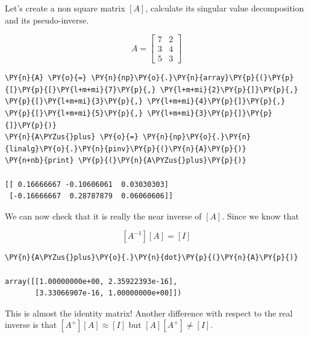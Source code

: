 

Let's create a non square matrix $[A]$, calculate its singular value decomposition and its pseudo-inverse.

\[A=\begin{bmatrix}
7&2\\
3&4\\
5&3\end{bmatrix}\]

\begin{tcolorbox}[breakable, size=fbox, boxrule=1pt, pad at break*=1mm,colback=cellbackground, colframe=cellborder]
\begin{Verbatim}[commandchars=\\\{\}]
\PY{n}{A} \PY{o}{=} \PY{n}{np}\PY{o}{.}\PY{n}{array}\PY{p}{(}\PY{p}{[}\PY{p}{[}\PY{l+m+mi}{7}\PY{p}{,} \PY{l+m+mi}{2}\PY{p}{]}\PY{p}{,} \PY{p}{[}\PY{l+m+mi}{3}\PY{p}{,} \PY{l+m+mi}{4}\PY{p}{]}\PY{p}{,} \PY{p}{[}\PY{l+m+mi}{5}\PY{p}{,} \PY{l+m+mi}{3}\PY{p}{]}\PY{p}{]}\PY{p}{)}
\PY{n}{A\PYZus{}plus} \PY{o}{=} \PY{n}{np}\PY{o}{.}\PY{n}{linalg}\PY{o}{.}\PY{n}{pinv}\PY{p}{(}\PY{n}{A}\PY{p}{)}
\PY{n+nb}{print} \PY{p}{(}\PY{n}{A\PYZus{}plus}\PY{p}{)}
	
[[ 0.16666667 -0.10606061  0.03030303]
 [-0.16666667  0.28787879  0.06060606]]
	\end{Verbatim}
\end{tcolorbox}
We can now check that it is really the near inverse of $[A]$.
Since we know that

\[[A^{−1}][A]=[I]\]

\begin{tcolorbox}[breakable, size=fbox, boxrule=1pt, pad at break*=1mm,colback=cellbackground, colframe=cellborder]
\begin{Verbatim}[commandchars=\\\{\}]
\PY{n}{A\PYZus{}plus}\PY{o}{.}\PY{n}{dot}\PY{p}{(}\PY{n}{A}\PY{p}{)}
	
array([[1.00000000e+00, 2.35922393e-16],
       [3.33066907e-16, 1.00000000e+00]])
\end{Verbatim}
\end{tcolorbox}
This is almost the identity matrix!
Another difference with respect to the real inverse is that \([A^+][A]≈[I]\) but \([A][A^+]\neq [I]\).

